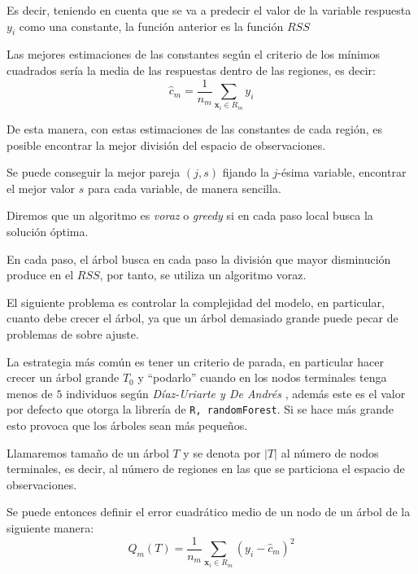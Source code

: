 \noindent Es decir, teniendo en cuenta que se va a predecir el valor de la variable respuesta $y_i$ como una constante, la función anterior es la función $RSS$ 

\noindent Las mejores estimaciones de las constantes según el criterio de los mínimos cuadrados sería la media de las respuestas dentro de las regiones, es decir: 
\begin{equation}
\hat{c}_m=\dfrac{1}{n_m}\sum_{\textbf{x}_i\in R_m} y_i
\end{equation}

\noindent De esta manera, con estas estimaciones de las constantes de cada región, es posible encontrar la mejor división del espacio de observaciones. 

\noindent Se puede conseguir la mejor pareja $(j,s)$ fijando la $j$-ésima variable, encontrar el mejor valor $s$ para cada variable, de manera sencilla.

\begin{defi}
Diremos que un algoritmo es \textit{voraz} o \textit{greedy} si en cada paso local busca la solución óptima. 
\end{defi}

\noindent En cada paso, el árbol busca en cada paso la división que mayor disminución produce en el $RSS$, por tanto, se utiliza un algoritmo voraz. 

\noindent El siguiente problema es controlar la complejidad del modelo, en particular, cuanto debe crecer el árbol, ya que un árbol demasiado grande  puede pecar de problemas de sobre ajuste. 

\noindent La estrategia más común es tener un criterio de parada, en particular hacer crecer un árbol grande $T_0$ y ``podarlo''   cuando en los nodos terminales tenga menos de $5$ individuos según \textit{Díaz-Uriarte y De Andrés} \cite{Diaz 2006}, además este es el valor por defecto que otorga la librería de  \texttt{R, randomForest}. Si se hace más grande esto provoca que los árboles sean más pequeños.


\begin{defi}
Llamaremos tamaño de un árbol $T$ y se denota por $|T|$ al número de nodos terminales, es decir, al número de regiones en las que se particiona el espacio de observaciones.
\end{defi}

\noindent Se puede entonces definir el error cuadrático medio de un nodo de un árbol de la siguiente manera:
\begin{equation}
Q_m(T)= \dfrac{1}{n_m}\sum_{\textbf{x}_i\in R_m}(y_i- \hat{c}_m)^2
\end{equation}

